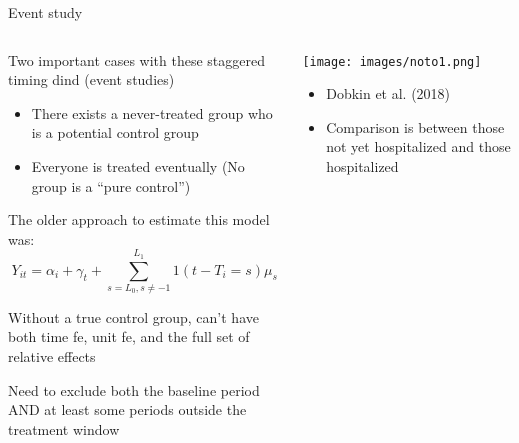 \documentclass[notes,11pt, aspectratio=169]{beamer}
\newenvironment{wideitemize}{\itemize\addtolength{\itemsep}{10pt}}{\enditemize}
\begin{document}
\begin{frame}{Event study}
  \begin{columns}[T] %
    \begin{column}{0.6\textwidth}
      \begin{wideitemize}
      \item Two important cases with these staggered timing dind (event studies)
        \begin{itemize}
        \item There exists a never-treated group who is a potential control group
        \item Everyone is treated eventually  (No group is a ``pure control'')
        \end{itemize}
      \item The older approach to estimate this model was:
        \begin{equation*}
          Y_{it} = \alpha_{i} + \gamma_{t} + \sum_{s = L_{0}, s\not=-1}^{L_{1}}1(t-T_{i} = s)\mu_{s}
        \end{equation*}
      \item Without a true control group, can't have both time
        fe, unit fe, and the full set of relative effects
        \vspace{-15pt}
      \item Need to exclude both the baseline period AND at least
        some periods outside the treatment window
      \end{wideitemize}
      \end{column}%
      \hfill%
      \begin{column}{.4\textwidth}
        \texttt{[image: images/noto1.png]}\\
        \begin{itemize}
        \item Dobkin et al. (2018)
        \item Comparison is between those not yet hospitalized and those hospitalized
        \end{itemize}
      \end{column}%
    \end{columns}
  \end{frame}
\end{document}
